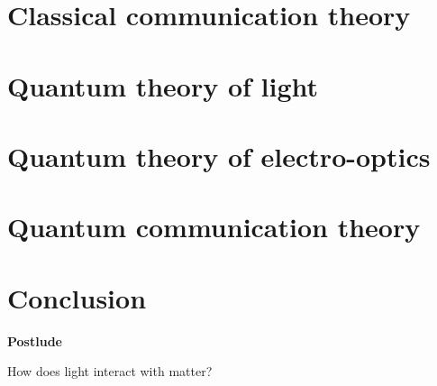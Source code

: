 \documentclass[aspectratio=169]{beamer}
\begin{document}
	\section{Classical communication theory}
	
	\section{Quantum theory of light}
	
	\section{Quantum theory of electro-optics}
	
	\section{Quantum communication theory}
	
	\section{Conclusion}
	
	\begin{frame}
		\begin{center}
			\textbf{Postlude}
			
			How does light interact with matter?
		\end{center}
	\end{frame}
\end{document}
